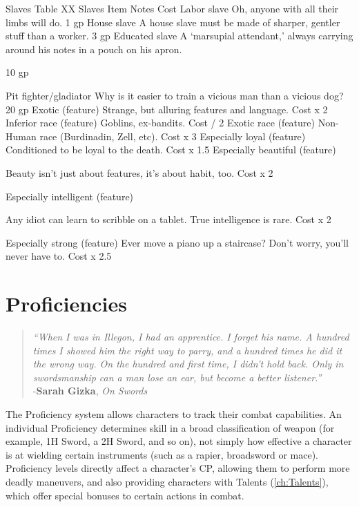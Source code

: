 \documentclass[oneside,11pt,english]{book}
\begin{document}
 


Slaves 
Table XX Slaves 
Item Notes Cost 
Labor slave Oh, anyone with all their limbs will do. 1 gp 
House slave A house slave must be made of sharper, gentler stuff than a worker. 3 gp 
Educated slave A ‘marsupial attendant,’ always carrying around his notes in a pouch on 
his apron. 

10 gp 

Pit fighter/gladiator Why is it easier to train a vicious man than a vicious dog? 20 gp 
Exotic (feature) Strange, but alluring features and language. Cost x 2 
Inferior race (feature) Goblins, ex-bandits. Cost / 2 
Exotic race (feature) Non-Human race (Burdinadin, Zell, etc). Cost x 3 
Especially loyal (feature) Conditioned to be loyal to the death. Cost x 
1.5 
Especially beautiful 
(feature) 

Beauty isn’t just about features, it’s about habit, too. Cost x 2 

Especially intelligent 
(feature) 

Any idiot can learn to scribble on a tablet. True intelligence is rare. Cost x 2 

Especially strong (feature) Ever move a piano up a staircase? Don’t worry, you’ll never have to. Cost x 
2.5 

 

 

\chapter{Proficiencies}\label{ch:proficiencies} %
\startcontents[chapters]
\clearpage
\begin{quote}
	\centering
\emph{“When I was in Illegon, I had an apprentice. I forget his name. A hundred times I showed him the right way to parry, and a hundred times he did it the wrong way. On the hundred and first time, I didn’t hold back. Only in swordsmanship can a man lose an ear, but become a better listener.”}\\
\hfill -\textbf{Sarah Gizka}, \textit{On Swords}
\end{quote}

The Proficiency system allows characters to track their combat capabilities. An individual Proficiency 
determines skill in a broad classification of weapon (for example, 1H Sword, a 2H Sword, and so on), not simply how effective a character is at wielding certain instruments (such as a rapier, broadsword or 
mace). Proficiency levels directly affect a character’s CP, allowing them to perform more deadly 
maneuvers, and also providing characters with Talents (\autoref{ch:Talents}), which offer special bonuses to certain actions in combat.
\end{document}
